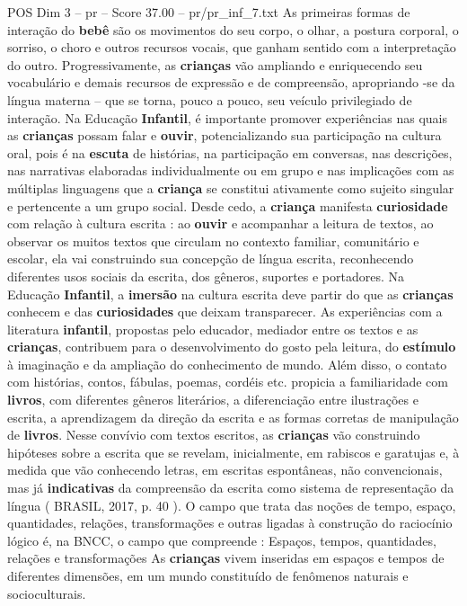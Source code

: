 \begin{textsample}{POS Dim 3 – pr – Score 37.00 – pr/pr\_inf\_7.txt}
As primeiras formas de interação do \textbf{bebê} são os movimentos do seu corpo, o olhar, a postura corporal, o sorriso, o choro e outros recursos vocais, que ganham sentido com a interpretação do outro.
Progressivamente, as \textbf{crianças} vão ampliando e enriquecendo seu vocabulário e demais recursos de expressão e de compreensão, apropriando -se da língua materna – que se torna, pouco a pouco, seu veículo privilegiado de interação.
Na Educação \textbf{Infantil}, é importante promover experiências nas quais as \textbf{crianças} possam falar e \textbf{ouvir}, potencializando sua participação na cultura oral, pois é na \textbf{escuta} de histórias, na participação em conversas, nas descrições, nas narrativas elaboradas individualmente ou em grupo e nas implicações com as múltiplas linguagens que a \textbf{criança} se constitui ativamente como sujeito singular e pertencente a um grupo social.
Desde cedo, a \textbf{criança} manifesta \textbf{curiosidade} com relação à cultura escrita : ao \textbf{ouvir} e acompanhar a leitura de textos, ao observar os muitos textos que circulam no contexto familiar, comunitário e escolar, ela vai construindo sua concepção de língua escrita, reconhecendo diferentes usos sociais da escrita, dos gêneros, suportes e portadores.
Na Educação \textbf{Infantil}, a \textbf{imersão} na cultura escrita deve partir do que as \textbf{crianças} conhecem e das \textbf{curiosidades} que deixam transparecer.
As experiências com a literatura \textbf{infantil}, propostas pelo educador, mediador entre os textos e as \textbf{crianças}, contribuem para o desenvolvimento do gosto pela leitura, do \textbf{estímulo} à imaginação e da ampliação do conhecimento de mundo.
Além disso, o contato com histórias, contos, fábulas, poemas, cordéis etc. propicia a familiaridade com \textbf{livros}, com diferentes gêneros literários, a diferenciação entre ilustrações e escrita, a aprendizagem da direção da escrita e as formas corretas de manipulação de \textbf{livros}.
Nesse convívio com textos escritos, as \textbf{crianças} vão construindo hipóteses sobre a escrita que se revelam, inicialmente, em rabiscos e garatujas e, à medida que vão conhecendo letras, em escritas espontâneas, não convencionais, mas já \textbf{indicativas} da compreensão da escrita como sistema de representação da língua ( BRASIL, 2017, p. 40 ).
O campo que trata das noções de tempo, espaço, quantidades, relações, transformações e outras ligadas à construção do raciocínio lógico é, na BNCC, o campo que compreende : Espaços, tempos, quantidades, relações e transformações As \textbf{crianças} vivem inseridas em espaços e tempos de diferentes dimensões, em um mundo constituído de fenômenos naturais e socioculturais.

\end{textsample}
